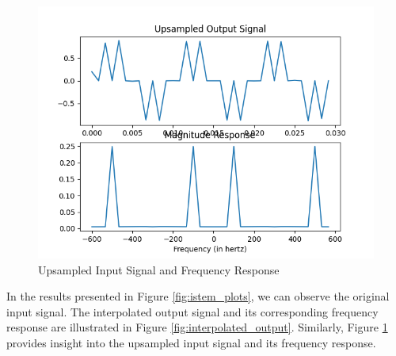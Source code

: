 \documentclass{article}
\begin{document}
\begin{figure}[ht]
  \centering
  \includegraphics[scale=0.8]{../figs/iupsampled_output.png}
  \caption{Upsampled Input Signal and Frequency Response}
  \label{fig:iupsampled_output}
\end{figure}
In the results presented in Figure \ref{fig:istem_plots}, we can observe the original input signal. The interpolated output signal and its corresponding frequency response are illustrated in Figure \ref{fig:interpolated_output}. Similarly, Figure \ref{fig:iupsampled_output} provides insight into the upsampled input signal and its frequency response.
\end{document}
